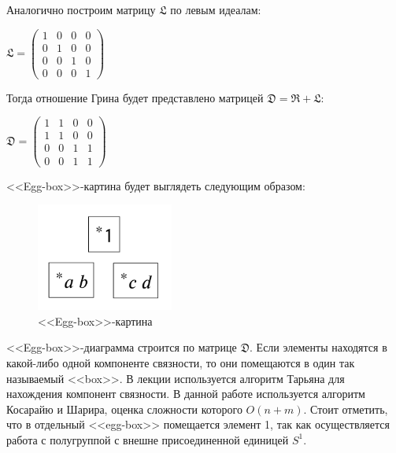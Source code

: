 \documentclass[bachelor, och, labwork]{shiza}
\begin{document}
    Аналогично построим матрицу $\mathfrak{L}$ по левым идеалам:

    \begin{center}
      $\mathfrak{L} =
      \begin{pmatrix}
          1 & 0 & 0 & 0 \\
          0 & 1 & 0 & 0 \\
          0 & 0 & 1 & 0 \\
          0 & 0 & 0 & 1
        \end{pmatrix}$
    \end{center}
    
    Тогда отношение Грина будет представлено матрицей $\mathfrak{D} = \mathfrak{R} + \mathfrak{L}$:

    \begin{center}
      $\mathfrak{D} =
      \begin{pmatrix}
        1 & 1 & 0 & 0 \\
        1 & 1 & 0 & 0 \\
        0 & 0 & 1 & 1 \\
        0 & 0 & 1 & 1
      \end{pmatrix}$
    \end{center}

    <<Egg-box>>-картина будет выглядеть следующим образом:

      \begin{figure}[H]
        \centering
        \includegraphics[width=0.4\textwidth]{photo/egg-box1.png}
        \caption{<<Egg-box>>-картина}
      \end{figure}

      <<Egg-box>>-диаграмма строится по матрице $\mathfrak{D}$. Если элементы находятся в какой-либо одной компоненте связности, то они помещаются в один так
      называемый <<box>>. В лекции используется алгоритм Тарьяна для нахождения компонент связности. В данной работе используется алгоритм Косарайю и Шарира,
      оценка сложности которого $O(n + m)$. Стоит отметить, что в отдельный <<egg-box>> помещается элемент 1, так как осуществляется работа с полугруппой 
      с внешне присоединенной единицей $S^1$.
\end{document}
